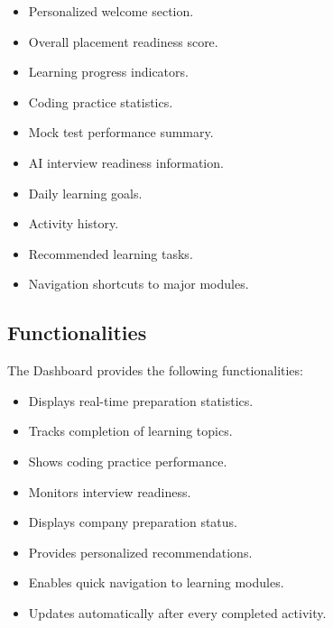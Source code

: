 \begin{itemize}

\item Personalized welcome section.

\item Overall placement readiness score.

\item Learning progress indicators.

\item Coding practice statistics.

\item Mock test performance summary.

\item AI interview readiness information.

\item Daily learning goals.

\item Activity history.

\item Recommended learning tasks.

\item Navigation shortcuts to major modules.

\end{itemize}

\subsection{Functionalities}

The Dashboard provides the following functionalities:

\begin{itemize}

\item Displays real-time preparation statistics.

\item Tracks completion of learning topics.

\item Shows coding practice performance.

\item Monitors interview readiness.

\item Displays company preparation status.

\item Provides personalized recommendations.

\item Enables quick navigation to learning modules.

\item Updates automatically after every completed activity.

\end{itemize}

